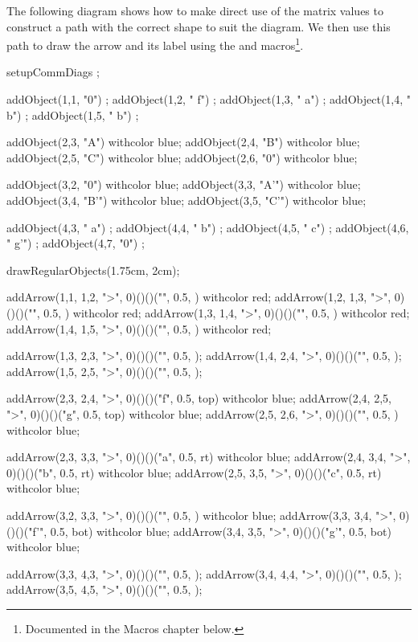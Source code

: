 The following diagram shows how to make direct use of the 
matrix values to construct a path with the correct shape to suit the
diagram. We then use this path to draw the arrow and its label using the
 and  macros\footnote{Documented in
the Macros chapter below.}.

\startbuffer[cdBuf]
\startformula{}
  setupCommDiags ;

  addObject(1,1, "0") ;
  addObject(1,2, "\; f") ;
  addObject(1,3, "\: a") ;
  addObject(1,4, "\: b") ;
  addObject(1,5, "\: b") ;

  addObject(2,3, "A") withcolor blue;
  addObject(2,4, "B") withcolor blue;
  addObject(2,5, "C") withcolor blue;
  addObject(2,6, "0") withcolor blue;

  addObject(3,2, "0")  withcolor blue;
  addObject(3,3, "A'") withcolor blue;
  addObject(3,4, "B'") withcolor blue;
  addObject(3,5, "C'") withcolor blue;

  addObject(4,3, "\: a") ;
  addObject(4,4, "\: b") ;
  addObject(4,5, "\: c") ;
  addObject(4,6, "\: g'") ;
  addObject(4,7, "0") ;

  drawRegularObjects(1.75cm, 2cm);

  addArrow(1,1, 1,2, ">", 0)()()("", 0.5, ) withcolor red;
  addArrow(1,2, 1,3, ">", 0)()()("", 0.5, ) withcolor red;
  addArrow(1,3, 1,4, ">", 0)()()("", 0.5, ) withcolor red;
  addArrow(1,4, 1,5, ">", 0)()()("", 0.5, ) withcolor red;

  addArrow(1,3, 2,3, ">", 0)()()("", 0.5, );
  addArrow(1,4, 2,4, ">", 0)()()("", 0.5, );
  addArrow(1,5, 2,5, ">", 0)()()("", 0.5, );

  addArrow(2,3, 2,4, ">", 0)()()("f", 0.5, top) withcolor blue;
  addArrow(2,4, 2,5, ">", 0)()()("g", 0.5, top) withcolor blue;
  addArrow(2,5, 2,6, ">", 0)()()("", 0.5, ) withcolor blue;

  addArrow(2,3, 3,3, ">", 0)()()("a", 0.5, rt) withcolor blue;
  addArrow(2,4, 3,4, ">", 0)()()("b", 0.5, rt) withcolor blue;
  addArrow(2,5, 3,5, ">", 0)()()("c", 0.5, rt) withcolor blue;

  addArrow(3,2, 3,3, ">", 0)()()("", 0.5, ) withcolor blue;
  addArrow(3,3, 3,4, ">", 0)()()("f'", 0.5, bot) withcolor blue;
  addArrow(3,4, 3,5, ">", 0)()()("g'", 0.5, bot) withcolor blue;

  addArrow(3,3, 4,3, ">", 0)()()("", 0.5, );
  addArrow(3,4, 4,4, ">", 0)()()("", 0.5, );
  addArrow(3,5, 4,5, ">", 0)()()("", 0.5, );

